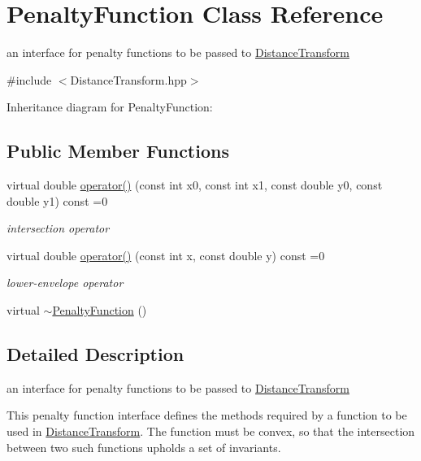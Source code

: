 \hypertarget{classPenaltyFunction}{}\section{Penalty\+Function Class Reference}
\label{classPenaltyFunction}


an interface for penalty functions to be passed to \hyperlink{classDistanceTransform}{Distance\+Transform}  




{\ttfamily \#include $<$Distance\+Transform.\+hpp$>$}



Inheritance diagram for Penalty\+Function\+:
\subsection*{Public Member Functions}
\begin{DoxyCompactItemize}
\item 
virtual double \hyperlink{classPenaltyFunction_a944230ce310515b1fe10972388c00042}{operator()} (const int x0, const int x1, const double y0, const double y1) const =0
\begin{DoxyCompactList}\small\item\em intersection operator \end{DoxyCompactList}\item 
virtual double \hyperlink{classPenaltyFunction_ad1f2cdbcfc85d0eaf3b734cafce60c48}{operator()} (const int x, const double y) const =0
\begin{DoxyCompactList}\small\item\em lower-\/envelope operator \end{DoxyCompactList}\item 
virtual \hyperlink{classPenaltyFunction_ac97741baf27aa9e506f430338f460498}{$\sim$\+Penalty\+Function} ()
\end{DoxyCompactItemize}


\subsection{Detailed Description}
an interface for penalty functions to be passed to \hyperlink{classDistanceTransform}{Distance\+Transform} 

This penalty function interface defines the methods required by a function to be used in \hyperlink{classDistanceTransform}{Distance\+Transform}. The function must be convex, so that the intersection between two such functions upholds a set of invariants. 

